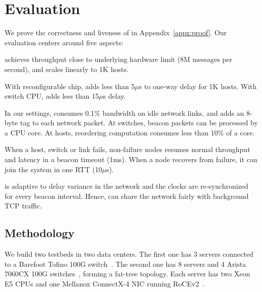 \section{Evaluation}
\label{sec:evaluation}

We prove the correctness and liveness of \sys in Appendix~\ref{appx:proof}. Our evaluation centers around five aspects:

\sys achieves throughput close to underlying hardware limit (8M messages per second), and scales linearly to 1K hosts.

With reconfigurable chip, \sys adds less than 5$\mu$s to one-way delay for 1K hosts. With switch CPU, \sys adds less than 15$\mu$s delay.

In our settings, \sys consumes 0.1\% bandwidth on idle network links, and adds an 8-byte tag to each network packet. At switches, beacon packets can be processed by a CPU core. At hosts, reordering computation consumes less than 10\% of a core.

When a host, switch or link fails, non-failure nodes resumes normal throughput and latency in a beacon timeout (1ms). When a node recovers from failure, it can join the system in one RTT (10$\mu$s).

\sys is adaptive to delay variance in the network and the clocks are re-synchronized for every beacon interval. Hence, \sys can share the network fairly with background TCP traffic.

\subsection{Methodology}
\label{sec:testbed}

We build two testbeds in two data centers.
The first one has 3 servers connected to a Barefoot Tofino 100G switch~\cite{tofino}.
The second one has 8 servers and 4 Arista 7060CX 100G switches~\cite{arista}, forming a fat-tree topology.
Each server has two Xeon E5 CPUs and one Mellanox ConnectX-4 NIC running RoCEv2~\cite{infinibandrocev2}.


